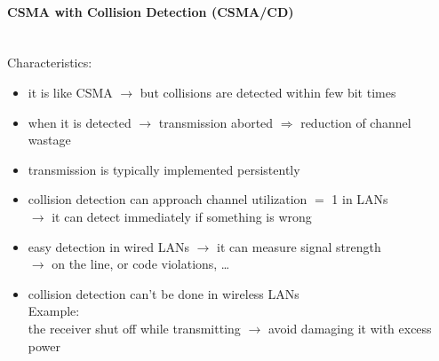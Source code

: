 \paragraph{CSMA with Collision Detection (CSMA/CD)}\mbox{}\\[0.2cm]
Characteristics:
\begin{itemize}
    \item it is like CSMA $\rightarrow$ but collisions are detected within few bit times
    \item when it is detected $\rightarrow$ transmission aborted $\Rightarrow$ reduction of channel wastage
    \item transmission is typically implemented persistently
    \item collision detection can approach channel utilization $=$ 1 in LANs\\ $\rightarrow$ it can detect immediately if something is wrong
    \item easy detection in wired LANs $\rightarrow$ it can
    measure signal strength\\ $\rightarrow$ on the line, or code violations, \dots
    \item collision detection can't be done in wireless LANs\\
    Example:\\
    the receiver shut off while transmitting $\rightarrow$ avoid damaging it with excess power
\end{itemize}













